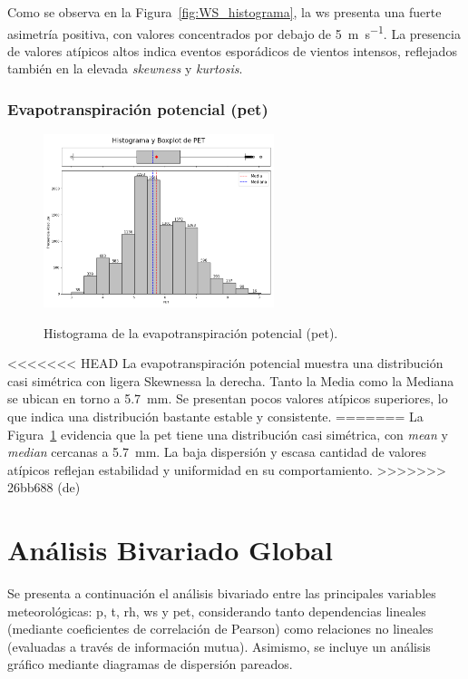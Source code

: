 Como se observa en la Figura~\ref{fig:WS_histograma}, la \gls{ws} presenta una fuerte asimetría positiva, con valores concentrados por debajo de \SI{5}{\meter\per\second}. La presencia de valores atípicos altos indica eventos esporádicos de vientos intensos, reflejados también en la elevada \textit{skewness} y \textit{kurtosis}.

\vspace{1.5em}

\subsubsection*{Evapotranspiración potencial (\gls{pet})}

\begin{figure}[htbp]
    \centering
    \caption{Histograma de la evapotranspiración potencial (\gls{pet}).}
    \includegraphics[width=0.6\textwidth]{resultados/global/univariado/PET_histograma.png}
    \label{fig:PET_histograma}
\end{figure}

<<<<<<< HEAD
La evapotranspiración potencial muestra una distribución casi simétrica con ligera Skewnessa la derecha. Tanto la Media como la Mediana se ubican en torno a \SI{5.7}{\milli\meter}. Se presentan pocos valores atípicos superiores, lo que indica una distribución bastante estable y consistente.
=======
La Figura~\ref{fig:PET_histograma} evidencia que la \gls{pet} tiene una distribución casi simétrica, con \textit{mean} y \textit{median} cercanas a \SI{5.7}{\milli\meter}. La baja dispersión y escasa cantidad de valores atípicos reflejan estabilidad y uniformidad en su comportamiento.
>>>>>>> 26bb688 (de)

\section{Análisis Bivariado Global}

Se presenta a continuación el análisis bivariado entre las principales variables meteorológicas: \gls{p}, \gls{t}, \gls{rh}, \gls{ws} y \gls{pet}, considerando tanto dependencias lineales (mediante coeficientes de correlación de Pearson) como relaciones no lineales (evaluadas a través de información mutua). Asimismo, se incluye un análisis gráfico mediante diagramas de dispersión pareados.

